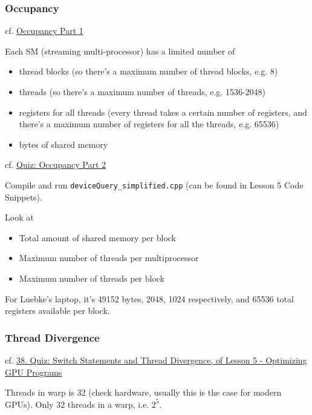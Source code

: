 \documentclass[10pt]{amsart}
\begin{document}
\begin{multicols*}{2}
\subsubsection{Occupancy}

cf. \href{https://classroom.udacity.com/courses/cs344/lessons/109244577/concepts/1118375690923#}{Occupancy Part 1}

Each SM (streaming multi-processor) has a limited number of
\begin{itemize}
\item thread blocks (so there's a maximum number of thread blocks, e.g. 8)
\item threads (so there's a maximum number of threads, e.g. 1536-2048)
\item registers for all threads (every thread takes a certain number of registers, and there's a maximum number of registers for all the threads, e.g. 65536)
\item bytes of shared memory
  \end{itemize}

cf. \href{https://classroom.udacity.com/courses/cs344/lessons/109244577/concepts/1110067030923}{Quiz: Occupancy Part 2}

Compile and run \verb|deviceQuery_simplified.cpp| (can be found in Lesson 5 Code Snippets).

Look at

\begin{itemize}
\item Total amount of shared memory per block
\item Maximum number of threads per multiprocessor  
\item Maximum number of threads per block  
\end{itemize}
  
For Luebke's laptop, it's 49152 bytes, 2048, 1024 respectively, and 65536 total registers available per block.  

\subsubsection{Thread Divergence}

cf. \href{https://classroom.udacity.com/courses/cs344/lessons/109244577/concepts/1109210790923#}{38. Quiz: Switch Statements and Thread Divergence, of Lesson 5 - Optimizing GPU Programs}

Threads in warp is 32 (check hardware, usually this is the case for modern GPUs).  Only 32 threads in a warp, i.e. $2^5$.


\end{multicols*}
\end{document}
